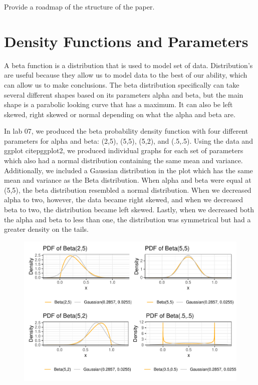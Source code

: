 \documentclass{article}\usepackage[]{graphicx}\usepackage[]{xcolor}
\begin{document}
\begin{multicols}{2}
Provide a roadmap of the structure of the paper. 


\section{Density Functions and Parameters}
  A beta function is a distribution that is used to model set of data. Distribution's are useful because they allow us to model data to the best of our ability, which can allow us to make conclusions. The beta distribution specifically can take several different shapes based on its parameters alpha and beta,  but the main shape is a parabolic looking curve that has a maximum. It can also be left skewed, right skewed or normal depending on what the alpha and beta are. 

  In lab 07, we produced the beta probability density function with four different parameters for alpha and beta: (2,5), (5,5), (5,2), and (.5,.5). Using the data and ggplot citep{ggplot2}, we produced individual graphs for each set of parameters which also had a normal distribution containing the same mean and variance. Additionally, we included a Gaussian distribution in the plot which has the same mean and variance as the Beta distribution. When alpha and beta were equal at (5,5), the beta distribution resembled a normal distribution. When we decreased alpha to two, however, the data became right skewed, and when we decreased beta to two, the distribution became left skewed. Lastly, when we decreased both the alpha and beta to less than one, the distribution was symmetrical but had a greater density on the tails. 
  
  
   \begin{figure}[H]
    \begin{center}
       \includegraphics[scale=0.5]{densityf.pdf}
       \caption{}
     \label{densityf}
     \end{center}
   \end{figure}


\end{multicols}
\end{document}
